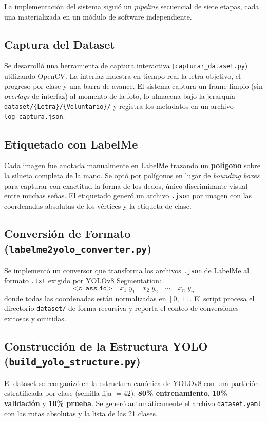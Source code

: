 \documentclass[12pt,letterpaper]{article}
\begin{document}
La implementación del sistema siguió un \textit{pipeline} secuencial de siete etapas, cada una materializada en un módulo de software independiente.

\subsection{Captura del Dataset}
Se desarrolló una herramienta de captura interactiva (\texttt{capturar\_dataset.py}) utilizando OpenCV. La interfaz muestra en tiempo real la letra objetivo, el progreso por clase y una barra de avance. El sistema captura un frame limpio (sin \textit{overlays} de interfaz) al momento de la foto, lo almacena bajo la jerarquía \texttt{dataset/\{Letra\}/\{Voluntario\}/} y registra los metadatos en un archivo \texttt{log\_captura.json}.

\subsection{Etiquetado con LabelMe}
Cada imagen fue anotada manualmente en LabelMe trazando un \textbf{polígono} sobre la silueta completa de la mano. Se optó por polígonos en lugar de \textit{bounding boxes} para capturar con exactitud la forma de los dedos, único discriminante visual entre muchas señas. El etiquetado generó un archivo \texttt{.json} por imagen con las coordenadas absolutas de los vértices y la etiqueta de clase.

\subsection{Conversión de Formato (\texttt{labelme2yolo\_converter.py})}
Se implementó un conversor que transforma los archivos \texttt{.json} de LabelMe al formato \texttt{.txt} exigido por YOLOv8 Segmentation:
\[
\texttt{<class\_id>} \quad x_1 \; y_1 \quad x_2 \; y_2 \quad \cdots \quad x_n \; y_n
\]
donde todas las coordenadas están normalizadas en $[0,\,1]$. El script procesa el directorio \texttt{dataset/} de forma recursiva y reporta el conteo de conversiones exitosas y omitidas.

\subsection{Construcción de la Estructura YOLO (\texttt{build\_yolo\_structure.py})}
El dataset se reorganizó en la estructura canónica de YOLOv8 con una partición estratificada por clase (semilla fija $= 42$): \textbf{80\% entrenamiento}, \textbf{10\% validación} y \textbf{10\% prueba}. Se generó automáticamente el archivo \texttt{dataset.yaml} con las rutas absolutas y la lista de las 21 clases.
\end{document}
